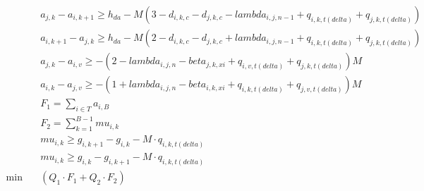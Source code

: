 \begin{align}
  & a_{j , k} - a_{i , k + 1} \geq h_{d a} - M \left(3 - d_{i , k , c} - d_{j , k , c} - \mathit{lambda}_{i , j , n - 1} + q_{i , k , t \left(\mathit{delta}\right)} + q_{j , k , t \left(\mathit{delta}\right)}\right) \tag{eq\_0032\_a} \\
  & a_{i , k + 1} - a_{j , k} \geq h_{d a} - M \left(2 - d_{i , k , c} - d_{j , k , c} + \mathit{lambda}_{i , j , n - 1} + q_{i , k , t \left(\mathit{delta}\right)} + q_{j , k , t \left(\mathit{delta}\right)}\right) \tag{eq\_0032\_b} \\
  & a_{j , k} - a_{i , v} \geq - \left(2 - \mathit{lambda}_{i , j , n} - \mathit{beta}_{j , k , \mathit{xi}} + q_{i , v , t \left(\mathit{delta}\right)} + q_{j , k , t \left(\mathit{delta}\right)}\right) M \tag{eq\_0034} \\
  & a_{i , k} - a_{j , v} \geq - \left(1 + \mathit{lambda}_{i , j , n} - \mathit{beta}_{i , k , \mathit{xi}} + q_{i , k , t \left(\mathit{delta}\right)} + q_{j , v , t \left(\mathit{delta}\right)}\right) M \tag{eq\_0036} \\
  & F_{1} = \sum_{i \in T} a_{i , B} \tag{eq\_0038} \\
  & F_{2} = \sum_{k = 1}^{B - 1} \mathit{mu}_{i , k} \tag{eq\_0039} \\
  & \mathit{mu}_{i , k} \geq g_{i , k + 1} - g_{i , k} - M \cdot q_{i , k , t \left(\mathit{delta}\right)} \tag{eq\_0041\_a} \\
  & \mathit{mu}_{i , k} \geq g_{i , k} - g_{i , k + 1} - M \cdot q_{i , k , t \left(\mathit{delta}\right)} \tag{eq\_0041\_b} \\
  \min\quad & \left(Q_{1} \cdot F_{1} + Q_{2} \cdot F_{2}\right) \tag{eq\_0042} \\
\end{align}

